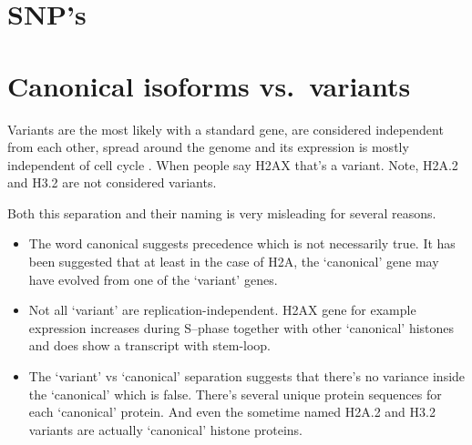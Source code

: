 \documentclass[10pt,a4paper,draft,article]{memoir}
\newcommand{\addref}[1][]{\todo[color=red!40,size=\tiny]{Add reference: #1}}
\begin{document}
  \section{SNP's}

  \section{Canonical isoforms vs.~variants}

    Variants are the most likely with a standard gene, are considered independent from each other,
    spread around the genome and its expression is mostly independent of cell cycle . When people say H2AX that's
    a variant. Note, H2A.2 and H3.2 are not considered variants.

    Both this separation and their naming is very misleading 
    for several reasons.
    \begin{itemize}
      \item The word canonical suggests precedence which is not necessarily true. It has been
            suggested that at least in the case of H2A, the `canonical' gene may have evolved
            from one of the `variant' genes\addref.
      \item Not all `variant' are replication-independent. H2AX gene for example expression
            increases during S--phase together with other `canonical' histones and does show
            a transcript with stem-loop.
      \item The `variant' vs `canonical' separation suggests that there's no variance inside
            the `canonical' which is false. There's several unique protein sequences for each
            `canonical' protein. And even the sometime named H2A.2 and H3.2 variants are actually
            `canonical' histone proteins.
    \end{itemize}
\end{document}
